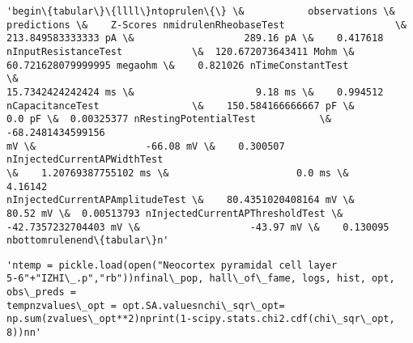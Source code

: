             \begin{tcolorbox}[breakable, size=fbox, boxrule=.5pt, pad at break*=1mm, opacityfill=0]
\begin{Verbatim}[commandchars=\\\{\}]
'begin\{tabular\}\{llll\}ntoprulen\{\} \&           observations \&
predictions \&    Z-Scores nmidrulenRheobaseTest                   \&
213.849583333333 pA \&                   289.16 pA \&    0.417618
nInputResistanceTest            \&  120.672073643411 Mohm \&
60.721628079999995 megaohm \&    0.821026 nTimeConstantTest               \&
15.7342424242424 ms \&                     9.18 ms \&    0.994512
nCapacitanceTest                \&    150.584166666667 pF \&
0.0 pF \&  0.00325377 nRestingPotentialTest           \&   -68.2481434599156
mV \&                   -66.08 mV \&    0.300507 nInjectedCurrentAPWidthTest
\&    1.20769387755102 ms \&                      0.0 ms \&     4.16142
nInjectedCurrentAPAmplitudeTest \&    80.4351020408164 mV \&
80.52 mV \&  0.00513793 nInjectedCurrentAPThresholdTest \&
-42.7357232704403 mV \&                   -43.97 mV \&    0.130095
nbottomrulenend\{tabular\}n'
\end{Verbatim}
\end{tcolorbox}
        
            \begin{tcolorbox}[breakable, size=fbox, boxrule=.5pt, pad at break*=1mm, opacityfill=0]
\begin{Verbatim}[commandchars=\\\{\}]
'ntemp = pickle.load(open("Neocortex pyramidal cell layer
5-6"+"IZHI\_.p","rb"))nfinal\_pop, hall\_of\_fame, logs, hist, opt, obs\_preds =
tempnzvalues\_opt = opt.SA.valuesnchi\_sqr\_opt=
np.sum(zvalues\_opt**2)nprint(1-scipy.stats.chi2.cdf(chi\_sqr\_opt, 8))nn'
\end{Verbatim}
\end{tcolorbox}
        




    